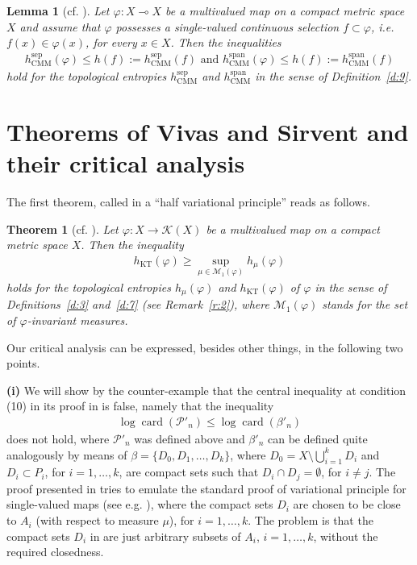 \documentclass[12pt]{amsart}
\newtheorem{thm}{Theorem}
\newtheorem{lemma}{Lemma}
\theoremstyle{definition}
\newcommand{\K}{\mathcal{K}}
\newcommand{\card}{\operatorname{card}}
\newcommand{\M}{{\mathcal{M}}}
\renewcommand{\P}{{\mathcal{P}}}
\newcommand{\vp}{\varphi}
\newcommand{\spa}{\operatorname{span}}
\newcommand{\sepp}{\operatorname{sep}}
\newcommand{\KT}{\operatorname{KT}}
\newcommand{\hKT}{h_{\KT}}
\newcommand{\CM}{\operatorname{CMM}}
\newcommand{\hCM}{h_{\CM}}
\begin{document}
\begin{lemma}[cf. {\cite[Theorem 3.5]{CMM1}}]\label{l:6}
Let $\vp:X\multimap X$ be a multivalued map on a compact metric space $X$ and assume that $\vp$ possesses a single-valued continuous selection $f\subset\vp$, i.e. $f(x)\in\vp(x)$, for every $x\in X$. Then the inequalities
\begin{align}\label{eq:A5}
\hCM^{\sepp}(\vp)\leq h(f):=\hCM^{\sepp}(f) \mbox{ and } \hCM^{\spa}(\vp)\leq h(f):=\hCM^{\spa}(f)
\end{align}
hold for the topological entropies $\hCM^{\sepp}$ and $\hCM^{\spa}$ in the sense of Definition~\ref{d:9}.
\end{lemma}


\section{Theorems of Vivas and Sirvent and their critical analysis}

The first theorem, called in \cite{VS} a ``half variational principle'' reads as follows.

\begin{thm}[cf. {\cite[Theorem 3.2]{VS}}]\label{t:1}
Let $\vp:X\to\K(X)$ be a multivalued map on a compact metric space $X$. Then the inequality
\begin{align}\label{eq:A6}
\hKT(\vp)\geq\sup_{\mu\in\M_1(\vp)} h_\mu(\vp)
\end{align}
holds for the topological entropies $h_\mu(\vp)$ and $\hKT(\vp)$ of $\vp$ in the sense of Definitions~\ref{d:3} and~\ref{d:7} (see Remark~\ref{r:2}), where $\M_1(\vp)$ stands for the set of $\vp$-invariant measures.
\end{thm}

Our critical analysis can be expressed, besides other things, in the following two points.

\textbf{(i)} We will show by the counter-example that the central inequality at condition (10) in its proof in \cite[Theorem 3.2]{VS} is false, namely that the inequality
\begin{align}\label{eq:A7}
\log \card(\P'_n)\leq \log \card(\beta'_n)
\end{align}
does not hold, where $\P'_n$ was defined above and $\beta'_n$ can be defined quite analogously by means of $\beta=\{D_0,D_1,\ldots,D_k\}$, where $D_0=X\setminus \bigcup_{i=1}^{k} D_i$ and $D_i\subset P_i$, for $i=1,\ldots,k$, are compact sets such that $D_i\cap D_j = \emptyset$, for $i\neq j$. The proof presented in \cite{VS} tries to emulate the standard proof of variational principle for single-valued maps (see e.g. \cite[Theorem 8.6]{Wa}), where the compact sets $D_i$ are chosen to be close to $A_i$ (with respect to measure $\mu$), for $i=1,\ldots,k$. The problem is that the compact sets $D_i$ in \cite{VS} are just arbitrary subsets of $A_i$, $i=1,\ldots,k$, without the required closedness.
\end{document}
